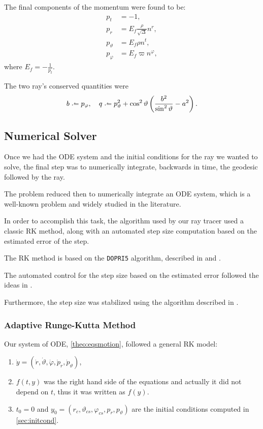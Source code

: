 The final components of the momentum \cite[Eq. (A.11)]{thorne15} were found to be:
\begin{align}
p_t &= -1, \\
p_r &= E_f \frac{\rho}{\sqrt{\Delta}} n^r, \\
p_\vartheta &= E_f \rho n^t, \\
p_\varphi &= E_f \varpi n^\varphi,
\end{align}
where $E_f = - \frac{1}{p_t}$.

The two ray's conserved quantities \cite[Eq. (A.12)]{thorne15} were
\begin{equation}
b \defeq p_\varphi, \quad q \defeq p_\vartheta^2 + \cos^2\vartheta \left( \frac{b^2}{\sin^2\vartheta} - a^2 \right).
\end{equation}

\subsection{Numerical Solver}
\label{sec:numerical}

Once we had the \ac{ODE} system and the initial conditions for the ray we wanted to solve, the final step was to numerically integrate, backwards in time, the geodesic followed by the ray.

The problem reduced then to numerically integrate an \ac{ODE} system, which is a well-known problem and widely studied in the literature.

In order to accomplish this task, the algorithm used by our ray tracer used a classic \ac{RK} method, along with an automated step size computation based on the estimated error of the step.

The \ac{RK} method is based on the \texttt{DOPRI5} algorithm, described in \cite{hairer93} and \cite{hairer96}.

The automated control for the step size based on the estimated error followed the ideas in \cite[Sec. II.4, Subsec. Automatic Step Size Control]{hairer93}.

Furthermore, the step size was stabilized using the algorithm described in \cite[Sec. IV.2]{hairer96}.

\subsubsection*{Adaptive Runge-Kutta Method}

Our system of \ac{ODE}, \autoref{theo:eqsmotion}, followed a general \ac{RK} model:
\begin{enumerate}
	\item $\dot{y} = (\dot{r}, \dot{\vartheta}, \dot{\varphi}, \dot{p}_r, \dot{p}_\vartheta)$,
	\item $f(t,y)$ was the right hand side of the equations and actually it did not depend on $t$, thus it was written as $f(y)$.
	\item $t_0 = 0$ and $y_0 = (r_c, \vartheta_{cs}, \varphi_{cs}, p_{r}, p_{\vartheta})$ are the initial conditions computed in \autoref{sec:initcond}.
\end{enumerate}

